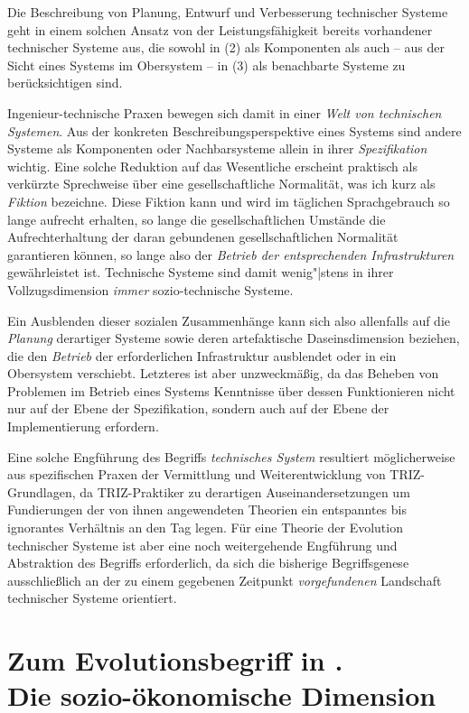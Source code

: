 \documentclass[11pt,a4paper]{article}
\begin{document}
Die Beschreibung von Planung, Entwurf und Verbesserung technischer Systeme
geht in einem solchen Ansatz von der Leistungsfähigkeit bereits vorhandener
technischer Systeme aus, die sowohl in (2) als Komponenten als auch -- aus der
Sicht eines Systems im Obersystem -- in (3) als benachbarte Systeme zu
berücksichtigen sind.

Ingenieur-technische Praxen bewegen sich damit in einer \emph{Welt von
  technischen Systemen}. Aus der konkreten Beschreibungsperspektive eines
Systems sind andere Systeme als Komponenten oder Nachbarsysteme allein in
ihrer \emph{Spezifikation} wichtig. Eine solche Reduktion auf das Wesentliche
erscheint praktisch als verkürzte Sprechweise über eine gesellschaftliche
Normalität, was ich kurz als \emph{Fiktion} bezeichne.  Diese Fiktion kann und
wird im täglichen Sprachgebrauch so lange aufrecht erhalten, so lange die
gesellschaftlichen Umstände die Aufrechterhaltung der daran gebundenen
gesellschaftlichen Normalität garantieren können, so lange also der
\emph{Betrieb der entsprechenden Infrastrukturen} gewährleistet ist.
Technische Systeme sind damit wenig"|stens in ihrer Vollzugsdimension
\emph{immer} sozio-technische Systeme.

Ein Ausblenden dieser sozialen Zusammenhänge kann sich also allenfalls auf die
\emph{Planung} derartiger Systeme sowie deren artefaktische Daseinsdimension
beziehen, die den \emph{Betrieb} der erforderlichen Infrastruktur ausblendet
oder in ein Obersystem verschiebt.  Letzteres ist aber unzweckmäßig, da das
Beheben von Problemen im Betrieb eines Systems Kenntnisse über dessen
Funktionieren nicht nur auf der Ebene der Spezifikation, sondern auch auf der
Ebene der Implementierung erfordern.

Eine solche Engführung des Begriffs \emph{technisches System} resultiert
möglicherweise aus spezifischen Praxen der Vermittlung und Weiterentwicklung
von TRIZ-Grundlagen, da TRIZ-Praktiker zu derartigen Auseinandersetzungen um
Fundierungen der von ihnen angewendeten Theorien ein entspanntes bis
ignorantes Verhältnis an den Tag legen. Für eine Theorie der Evolution
technischer Systeme ist aber eine noch weitergehende Engführung und
Abstraktion des Begriffs erforderlich, da sich die bisherige Begriffsgenese
ausschließlich an der zu einem gegebenen Zeitpunkt \emph{vorgefundenen}
Landschaft technischer Systeme orientiert.

\section{Zum Evolutionsbegriff in \cite{TESE2018}.\\ Die sozio-ökonomische
  Dimension} 
\end{document}
